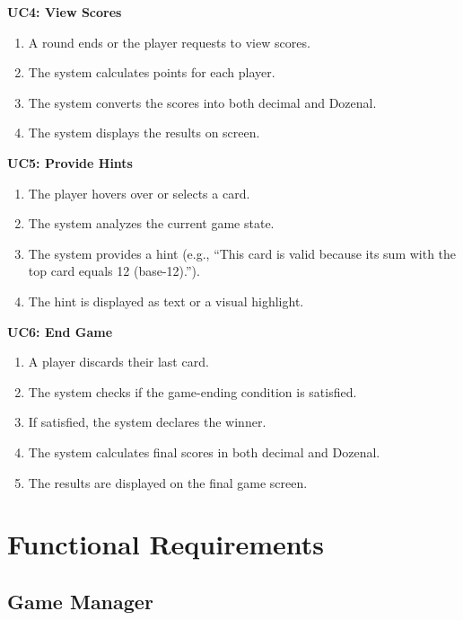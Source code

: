 \documentclass[12pt]{article}
\begin{document}
\noindent\textbf{UC4: View Scores}
\begin{enumerate}
    \item A round ends or the player requests to view scores.
    \item The system calculates points for each player.
    \item The system converts the scores into both decimal and Dozenal.
    \item The system displays the results on screen.
\end{enumerate}

\noindent\textbf{UC5: Provide Hints}
\begin{enumerate}
    \item The player hovers over or selects a card.
    \item The system analyzes the current game state.
    \item The system provides a hint (e.g., ``This card is valid because its sum with the top card equals 12 (base-12).'').
    \item The hint is displayed as text or a visual highlight.
\end{enumerate}

\noindent\textbf{UC6: End Game}
\begin{enumerate}
    \item A player discards their last card.
    \item The system checks if the game-ending condition is satisfied.
    \item If satisfied, the system declares the winner.
    \item The system calculates final scores in both decimal and Dozenal.
    \item The results are displayed on the final game screen.
\end{enumerate}



\section{Functional Requirements}

\subsection{Game Manager}
\end{document}
